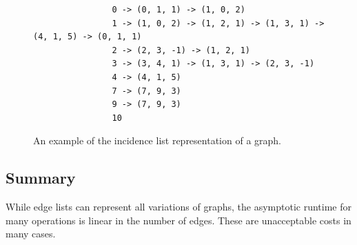             \begin{figure}[htp]
            \begin{center}
            \begin{verbatim}
                0 -> (0, 1, 1) -> (1, 0, 2)
                1 -> (1, 0, 2) -> (1, 2, 1) -> (1, 3, 1) -> (4, 1, 5) -> (0, 1, 1)
                2 -> (2, 3, -1) -> (1, 2, 1)
                3 -> (3, 4, 1) -> (1, 3, 1) -> (2, 3, -1)
                4 -> (4, 1, 5)
                7 -> (7, 9, 3)
                9 -> (7, 9, 3)
                10
            \end{verbatim}
            \end{center}
            \caption{An example of the incidence list representation of a graph.}
            \label{incidencel}
            \end{figure}
            
        
        
        \subsection*{Summary}
            While edge lists can represent all variations of graphs, the asymptotic runtime for many operations is linear in the number of edges. 
            These are unacceptable costs in many cases.
            

